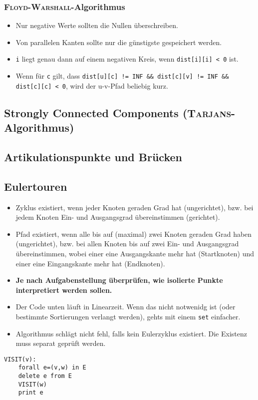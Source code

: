\subsubsection{\textsc{Floyd-Warshall}-Algorithmus}

\begin{itemize}[nosep]
	\item Nur negative Werte sollten die Nullen überschreiben.
	\item Von parallelen Kanten sollte nur die günstigste gespeichert werden.
	\item \lstinline{i} liegt genau dann auf einem negativen Kreis, wenn \lstinline{dist[i][i] < 0} ist.
	\item Wenn für \lstinline{c} gilt, dass \lstinline{dist[u][c] != INF && dist[c][v] != INF && dist[c][c] < 0}, wird der u-v-Pfad beliebig kurz.
\end{itemize}

\subsection{Strongly Connected Components (\textsc{Tarjans}-Algorithmus)}


\subsection{Artikulationspunkte und Brücken}


\subsection{Eulertouren}
\begin{itemize}[nosep]
	\item Zyklus existiert, wenn jeder Knoten geraden Grad hat (ungerichtet), bzw. bei jedem Knoten Ein- und Ausgangsgrad übereinstimmen (gerichtet).
	\item Pfad existiert, wenn alle bis auf (maximal) zwei Knoten geraden Grad haben (ungerichtet), bzw. bei allen Knoten bis auf zwei Ein- und Ausgangsgrad übereinstimmen, wobei einer eine Ausgangskante mehr hat (Startknoten) und einer eine Eingangskante mehr hat (Endknoten).
	\item \textbf{Je nach Aufgabenstellung überprüfen, wie isolierte Punkte interpretiert werden sollen.}
	\item Der Code unten läuft in Linearzeit.
	Wenn das nicht notwenidg ist (oder bestimmte Sortierungen verlangt werden), gehts mit einem \lstinline{set} einfacher.
	\item Algorithmus schlägt nicht fehl, falls kein Eulerzyklus existiert.
	Die Existenz muss separat geprüft werden.
\end{itemize}
\begin{lstlisting}
VISIT(v):
	forall e=(v,w) in E
	delete e from E
	VISIT(w)
	print e
\end{lstlisting}


